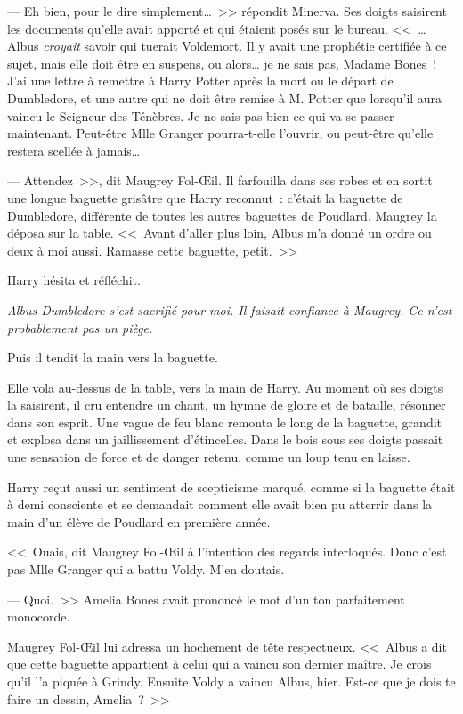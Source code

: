 --- Eh bien, pour le dire simplement…~>> répondit Minerva. Ses doigts saisirent les documents qu'elle avait apporté et qui étaient posés sur le bureau. <<~… Albus \emph{croyait} savoir qui tuerait Voldemort. Il y avait une prophétie certifiée à ce sujet, mais elle doit être en suspens, ou alors… je ne sais pas, Madame Bones~! J'ai une lettre à remettre à Harry Potter après la mort ou le départ de Dumbledore, et une autre qui ne doit être remise à M. Potter que lorsqu'il aura vaincu le Seigneur des Ténèbres. Je ne sais pas bien ce qui va se passer maintenant. Peut-être Mlle Granger pourra-t-elle l'ouvrir, ou peut-être qu'elle restera scellée à jamais…

--- Attendez~>>, dit Maugrey Fol-Œil. Il farfouilla dans ses robes et en sortit une longue baguette grisâtre que Harry reconnut~: c'était la baguette de Dumbledore, différente de toutes les autres baguettes de Poudlard. Maugrey la déposa sur la table. <<~Avant d'aller plus loin, Albus m'a donné un ordre ou deux à moi aussi. Ramasse cette baguette, petit.~>>

Harry hésita et réfléchit.

\emph{Albus Dumbledore s'est sacrifié pour moi. Il faisait confiance à Maugrey. Ce n'est probablement pas un piège.}

Puis il tendit la main vers la baguette.

Elle vola au-dessus de la table, vers la main de Harry. Au moment où ses doigts la saisirent, il cru entendre un chant, un hymne de gloire et de bataille, résonner dans son esprit. Une vague de feu blanc remonta le long de la baguette, grandit et explosa dans un jaillissement d'étincelles. Dans le bois sous ses doigts passait une sensation de force et de danger retenu, comme un loup tenu en laisse.

Harry reçut aussi un sentiment de scepticisme marqué, comme si la baguette était à demi consciente et se demandait comment elle avait bien pu atterrir dans la main d'un élève de Poudlard en première année.

<<~Ouais, dit Maugrey Fol-Œil à l'intention des regards interloqués. Donc c'est pas Mlle Granger qui a battu Voldy. M'en doutais.

--- Quoi.~>> Amelia Bones avait prononcé le mot d'un ton parfaitement monocorde.

Maugrey Fol-Œil lui adressa un hochement de tête respectueux. <<~Albus a dit que cette baguette appartient à celui qui a vaincu son dernier maître. Je crois qu'il l'a piquée à Grindy. Ensuite Voldy a vaincu Albus, hier. Est-ce que je dois te faire un dessin, Amelia~?~>>


